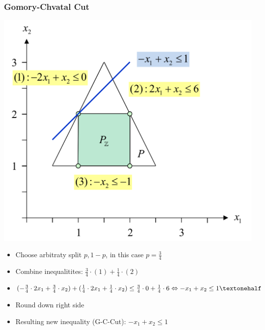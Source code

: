 \documentclass[11pt]{article}
\begin{document}
\subsubsection{Gomory-Chvatal Cut}
\begin{minipage}{0.4\linewidth}
	\begin{center}
		\includegraphics[width=\linewidth]{img/gomory_chvatal_cut_example}
	\end{center}
\end{minipage}
\begin{minipage}{0.6\linewidth}
	\begin{itemize}
		\item Choose arbitraty split $p, 1 - p$, in this case $p = \frac{3}{4}$
		\item Combine inequalitites: $\frac{3}{4} \cdot (1) + \frac{1}{4}\cdot(2)$
		\item $(-\frac{3}{4}\cdot2 x_1 + \frac{3}{4}\cdot x_2) + (\frac{1}{4}\cdot 2 x_1 + \frac{1}{4}\cdot x_2) \leq \frac{3}{4}\cdot 0 + \frac{1}{4}\cdot 6 \Leftrightarrow -x_1 + x_2 \leq 1\textonehalf$
		\item Round down right side
		\item Resulting new inequality (G-C-Cut): $ -x_1 + x_2 \leq 1$
	\end{itemize}
\end{minipage}
\end{document}
